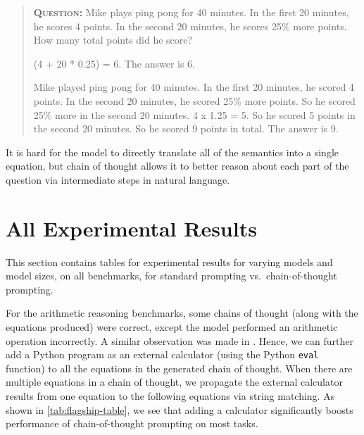 \documentclass[]{article}
\theoremstyle{plain}
\theoremstyle{definition}
\theoremstyle{remark}
\begin{document}
\begin{quote}
{\small{\textbf{\textsc{Question:}} Mike plays ping pong for 40 minutes. In the first 20 minutes, he scores 4 points. In the second 20 minutes, he scores 25\% more points.  How many total points did he score?}}

{\small{\textbf{\textsc{\color{blue}{Equation only (wrong answer):}}} (4 + 20 * 0.25) = 6. The answer is 6.}}

{\small{\textbf{\textsc{\color{darkGreen}{Chain of thought (correct):}}} Mike played ping pong for 40 minutes. In the first 20 minutes, he scored 4 points. In the second 20 minutes, he scored 25\% more points. So he scored 25\% more in the second 20 minutes. 4 x 1.25 = 5. So he scored 5 points in the second 20 minutes. So he scored 9 points in total. The answer is 9.}}
\end{quote}

It is hard for the model to directly translate all of the semantics into a single equation, but chain of thought allows it to better reason about each part of the question via intermediate steps in natural language. 


\clearpage
\section{All Experimental Results}\label{sec:all-results}

This section contains tables for experimental results for varying models and model sizes, on all benchmarks, for standard prompting vs.\ chain-of-thought prompting.

For the arithmetic reasoning benchmarks, some chains of thought (along with the equations produced) were correct, except the model performed an arithmetic operation incorrectly. 
A similar observation was made in \citet{cobbe2021training}.
Hence, we can further add a Python program as an external calculator (using the Python \texttt{\small eval} function) to all the equations in the generated chain of thought. 
When there are multiple equations in a chain of thought, we propagate the external calculator results from one equation to the following equations via string matching.
As shown in \cref{tab:flagship-table}, we see that adding a calculator significantly boosts performance of chain-of-thought prompting on most tasks.





\clearpage

\end{document}
